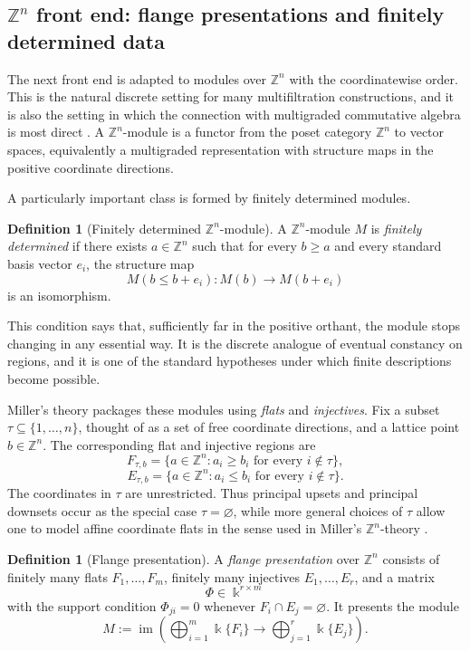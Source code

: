 \documentclass[11pt]{article}
\newcommand{\kk}{\Bbbk}
\theoremstyle{definition}
\newtheorem{defn}[theorem]{Definition}
\theoremstyle{remark}
\begin{document}
\subsection{$\mathbb{Z}^n$ front end: flange presentations and finitely determined data}

The next front end is adapted to modules over \(\mathbb{Z}^n\) with the coordinatewise order.  This is the natural discrete setting for many multifiltration constructions, and it is also the setting in which the connection with multigraded commutative algebra is most direct \cite{CZ09}.  A \(\mathbb{Z}^n\)-module is a functor from the poset category \(\mathbb{Z}^n\) to vector spaces, equivalently a multigraded representation with structure maps in the positive coordinate directions.

A particularly important class is formed by finitely determined modules.

\begin{defn}[Finitely determined \(\mathbb{Z}^n\)-module]
	A \(\mathbb{Z}^n\)-module \(M\) is \emph{finitely determined} if there exists \(a\in \mathbb{Z}^n\) such that for every \(b\geq a\) and every standard basis vector \(e_i\), the structure map
	\[
	M(b\leq b+e_i) : M(b)\longrightarrow M(b+e_i)
	\]
	is an isomorphism.
\end{defn}

This condition says that, sufficiently far in the positive orthant, the module stops changing in any essential way.  It is the discrete analogue of eventual constancy on regions, and it is one of the standard hypotheses under which finite descriptions become possible.

Miller's theory packages these modules using \emph{flats} and \emph{injectives}.  Fix a subset \(\tau\subseteq \{1,\dots,n\}\), thought of as a set of free coordinate directions, and a lattice point \(b\in \mathbb{Z}^n\).  The corresponding flat and injective regions are
\[
F_{\tau,b}=\{a\in \mathbb{Z}^n: a_i\geq b_i\text{ for every }i\notin \tau\},
\]
\[
E_{\tau,b}=\{a\in \mathbb{Z}^n: a_i\leq b_i\text{ for every }i\notin \tau\}.
\]
The coordinates in \(\tau\) are unrestricted.  Thus principal upsets and principal downsets occur as the special case \(\tau=\varnothing\), while more general choices of \(\tau\) allow one to model affine coordinate flats in the sense used in Miller's \(\mathbb{Z}^n\)-theory \cite{Mil20}.

\begin{defn}[Flange presentation]
	A \emph{flange presentation} over \(\mathbb{Z}^n\) consists of finitely many flats \(F_1,\dots,F_m\), finitely many injectives \(E_1,\dots,E_r\), and a matrix
	\[
	\Phi\in \kk^{r\times m}
	\]
	with the support condition \(\Phi_{ji}=0\) whenever \(F_i\cap E_j=\varnothing\).  It presents the module
	\[
	M:=\operatorname{im}\!\left(\bigoplus_{i=1}^m \kk\{F_i\}\longrightarrow \bigoplus_{j=1}^r \kk\{E_j\}\right).
	\]
\end{defn}
\end{document}

